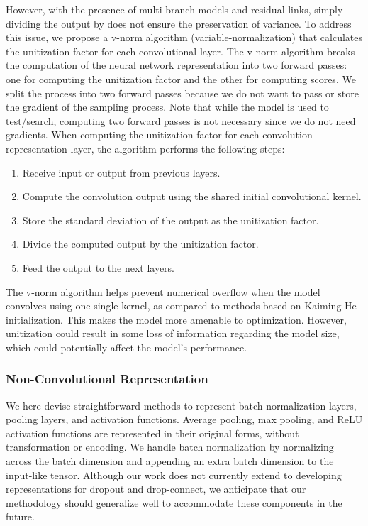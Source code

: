 \documentclass[lettersize,journal]{IEEEtran}
\begin{document}
        However, with the presence of multi-branch models and residual links, simply dividing the output by  does not ensure the preservation of variance. To address this issue, we propose a v-norm algorithm (variable-normalization) that calculates the unitization factor for each convolutional layer. The v-norm algorithm breaks the computation of the neural network representation into two forward passes: one for computing the unitization factor and the other for computing scores. We split the process into two forward passes because we do not want to pass or store the gradient of the sampling process. Note that while the model is used to test/search, computing two forward passes is not necessary since we do not need gradients. When computing the unitization factor for each convolution representation layer, the algorithm performs the following steps:
        
        \begin{enumerate}
        \item Receive input or output from previous layers.
        \item Compute the convolution output using the shared initial convolutional kernel.
        \item Store the standard deviation of the output as the unitization factor.
        \item Divide the computed output by the unitization factor.
        \item Feed the output to the next layers.
        \end{enumerate}

        The v-norm algorithm helps prevent numerical overflow when the model convolves using one single kernel, as compared to methods based on Kaiming He initialization. This makes the model more amenable to optimization. However, unitization could result in some loss of information regarding the model size, which could potentially affect the model's performance.

        \subsubsection{Non-Convolutional Representation}
            We here devise straightforward methods to represent batch normalization layers, pooling layers, and activation functions. Average pooling, max pooling, and ReLU activation functions are represented in their original forms, without transformation or encoding. We handle batch normalization by normalizing across the batch dimension and appending an extra batch dimension to the input-like tensor. Although our work does not currently extend to developing representations for dropout and drop-connect, we anticipate that our methodology should generalize well to accommodate these components in the future.
\end{document}
